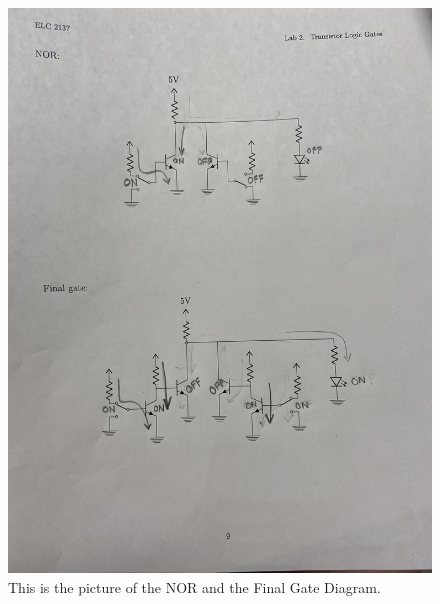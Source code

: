 \documentclass[11pt]{article}
\begin{document}
	\begin{figure}[ht]\centering
		\includegraphics[width=\textwidth, angle=270 ,trim=50 50 50  50,clip]{NOR_Final_Gate}
		\caption{This is the picture of the NOR and the Final Gate Diagram.}
		\label{fig:NOR_Final_Gate}
	\end{figure}
\end{document}
